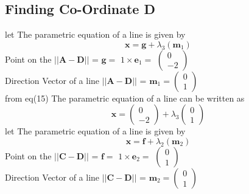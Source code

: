 \documentclass[journal,10pt,twocolumn]{article}
\let\vec\mathbf
\newcommand{\myvec}[1]{\ensuremath{\begin{pmatrix}#1\end{pmatrix}}}
\begin{document}
\begin{flushleft}
\subsection{Finding Co-Ordinate D}
let The parametric equation of a line is given by
\begin{equation}
 \boldsymbol{x} = \vec{g}+\lambda_3(\vec{m}_1)   
\end{equation}
Point on the $||\vec{A-D}||$ = 
\begin{math}
\vec{g} =
\end{math}
\begin{math}
1 \times \vec{e}_1 =
\end{math}
\begin{math}
\myvec{0 \\ -2}
\end{math}
\vspace{0.3cm}\\
Direction Vector of a line  $||\vec{A-D}||$ = 
\begin{math}
\vec{m}_1 = \myvec{0 \\ 1}
\end{math}
\vspace{0.3cm}\\
from eq(15) The parametric equation of a line can be written as
\begin{equation}
     \boldsymbol{x} = \myvec{0 \\ -2} + \lambda_3\myvec{0 \\ 1}
\end{equation}
let The parametric equation of a line is given by
\begin{equation}
 \boldsymbol{x} = \vec{f}+\lambda_2(\vec{m}_2)   
\end{equation}
Point on the $||\vec{C-D}||$ = 
\begin{math}
\vec{f} =
\end{math}
\begin{math}
1 \times \vec{e}_2 =
\end{math}
\begin{math}
\myvec{0 \\ 1}
\end{math}
\vspace{0.3cm}\\
Direction Vector of a line  $||\vec{C-D}||$ = 
\begin{math}
\vec{m}_2 = \myvec{0 \\ 1}
\end{math}
\vspace{0.3cm}\\

\end{flushleft}
\end{document}
